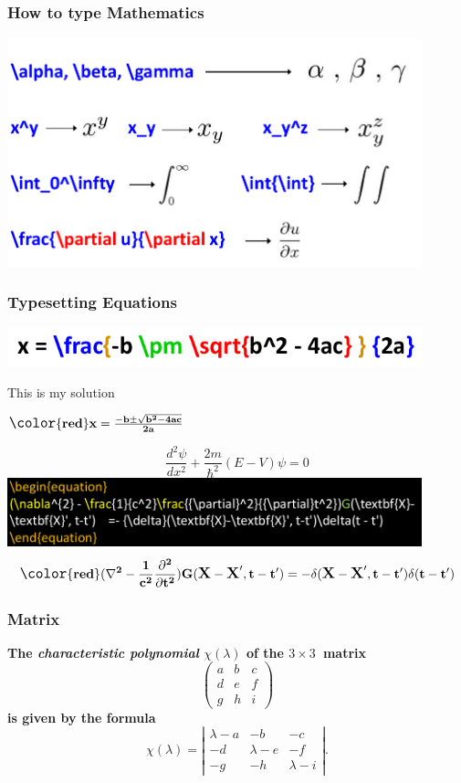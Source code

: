 \documentclass{beamer}
\begin{document}
	\begin{frame}
\frametitle{\bf How to type Mathematics}
\includegraphics[width=12cm]{HM}
\end{frame}
		\begin{frame}		
	\frametitle{\bf Typesetting Equations}
		\includegraphics[width=12cm]{EQ1}

		This is my solution

	$\large	\bf \color{red} x = \frac{-b \pm \sqrt{b^2 - 4ac} } {2a}$
	
		\begin{equation}
		\frac{d^2\psi}{dx^2} + \frac{2m}{\hbar^2}(E - V)\psi = 0
		\end{equation}
		\includegraphics[width=12cm]{EQ}
		\begin{equation}
		\large	\bf \color{red} (\nabla^{2} - \frac{1}{c^2}\frac{{\partial}^2}{{\partial}t^2})G(\textbf{X}-
			\textbf{X}', t-t') =- {\delta}(\textbf{X}-\textbf{X}', t-t')\delta(t - t')
		\end{equation}
		
	\end{frame}	
			\begin{frame}		
		\frametitle{\bf Matrix}	
		\bf \color{red}The \emph{characteristic polynomial} $\chi(\lambda)$ of the
		$3 \times 3$~matrix
		\color{blue}
		\[ \left( \begin{array}{ccc}
		a & b & c \\
		d & e & f \\
		g & h & i \end{array} \right)\]
	\bf \color{red}	is given by the formula
		\[ \chi(\lambda) = \left| \begin{array}{ccc}
		\lambda - a & -b & -c \\
		-d & \lambda - e & -f \\
		-g & -h & \lambda - i \end{array} \right|.\]
			\end{frame}	
\end{document}
